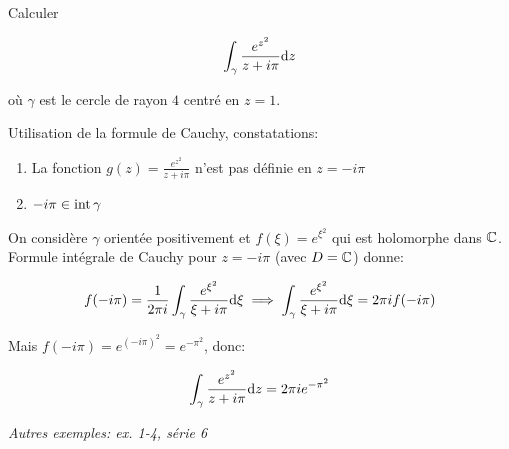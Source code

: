 \begin{example}[2]
    Calculer
    
    \[\int_\gamma \frac{e^{z^2}}{z + i\pi} \mathrm{d}z\]
    
    où $\gamma$ est le cercle de rayon $4$ centré en $z = 1$.
    
    Utilisation de la formule de Cauchy, constatations:
    
    \begin{enumerate}[label=\arabic{enumi})]
    \item 
    La fonction $g(z) = \frac{e^{z^2}}{z + i\pi}$ n'est pas définie en $z = -i\pi$
    \item 
    $-i\pi \in \textrm{int}\,{\gamma}$
    \end{enumerate}

    On considère $\gamma$ orientée positivement et $f(\xi) = e^{\xi^2}$ qui est holomorphe dans $\mathbb{C}$.
    Formule intégrale de Cauchy pour $z = -i\pi$ (avec $D = \mathbb{C}$) donne:
    
    \[
    f(-i\pi) = \frac{1}{2 \pi i} \int_\gamma \frac{e^{\xi^2}}{\xi + i\pi} \mathrm{d}\xi \implies \int_\gamma \frac{e^{\xi^2}}{\xi + i\pi} \mathrm{d}\xi = 2\pi i f(-i\pi)
    \]
    
    Mais $f(-i\pi) = e^{(-i\pi)^2} = e^{-\pi^2}$, donc:
    
    \[\int_\gamma \frac{e^{z^2}}{z + i\pi} \mathrm{d}z = 2\pi i e^{-\pi^2}\]
    
    \textit{Autres exemples: ex. 1-4, série 6}
\end{example}
